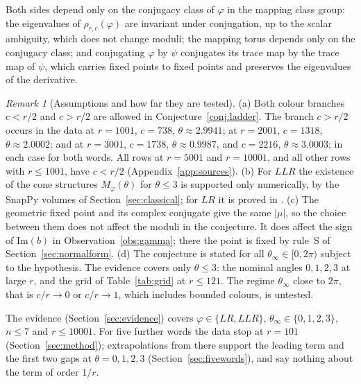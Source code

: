 \documentclass[11pt]{amsart}
\theoremstyle{definition}
\theoremstyle{remark}
\newtheorem{remark}[conjecture]{Remark}
\begin{document}
Both sides depend only on the conjugacy class of $\varphi$ in the mapping class
group: the eigenvalues of $\rho_{r,c}(\varphi)$ are invariant under conjugation, up to
the scalar ambiguity, which does not change moduli; the mapping torus depends only on
the conjugacy class; and conjugating $\varphi$ by $\psi$ conjugates its trace map by
the trace map of $\psi$, which carries fixed points to fixed points and preserves
the eigenvalues of the derivative.

\begin{remark}[Assumptions and how far they are tested]\label{rem:assumptions}
(a) Both colour branches $c < r/2$ and $c > r/2$ are allowed in
Conjecture~\ref{conj:ladder}. The branch $c > r/2$ occurs in the data at
$r = 1001$, $c = 738$, $\theta \approx 2.9941$; at $r = 2001$, $c = 1318$,
$\theta \approx 2.0002$; and at $r = 3001$, $c = 1738$, $\theta \approx 0.9987$, and
$c = 2216$, $\theta \approx 3.0003$; in each case for both words. All rows at
$r = 5001$ and $r = 10001$, and all other rows with $r \le 1001$, have $c < r/2$
(Appendix~\ref{app:sources}).
(b) For $LLR$ the existence of the cone structures $M_\varphi(\theta)$ for
$\theta \le 3$ is supported only numerically, by the SnapPy volumes of
Section~\ref{sec:classical}; for $LR$ it is proved in \cite[Lemma~4.1]{PW}.
(c) The geometric fixed point and its complex conjugate give the same $|\mu|$, so
the choice between them does not affect the moduli in the conjecture. It does affect
the sign of $\mathrm{Im}(b)$ in Observation~\ref{obs:gamma}; there the point is fixed by
rule~S of Section~\ref{sec:normalform}.
(d) The conjecture is stated for all $\theta_\infty \in [0, 2\pi)$ subject to the
hypothesis. The evidence covers only $\theta \le 3$: the nominal
angles $0, 1, 2, 3$ at large $r$, and the grid of Table~\ref{tab:grid} at
$r \le 121$. The regime $\theta_\infty$ close to $2\pi$, that is $c/r \to 0$ or
$c/r \to 1$, which includes bounded colours, is untested.
\end{remark}

The evidence (Section~\ref{sec:evidence}) covers $\varphi \in \{LR, LLR\}$,
$\theta_\infty \in \{0, 1, 2, 3\}$, $n \le 7$ and $r \le 10001$. For five further
words the data stop at $r = 101$ (Section~\ref{sec:method}); extrapolations from there
support the leading term and the first two gaps at $\theta = 0, 1, 2, 3$
(Section~\ref{sec:fivewords}), and say nothing about the term of order $1/r$.
\end{document}
